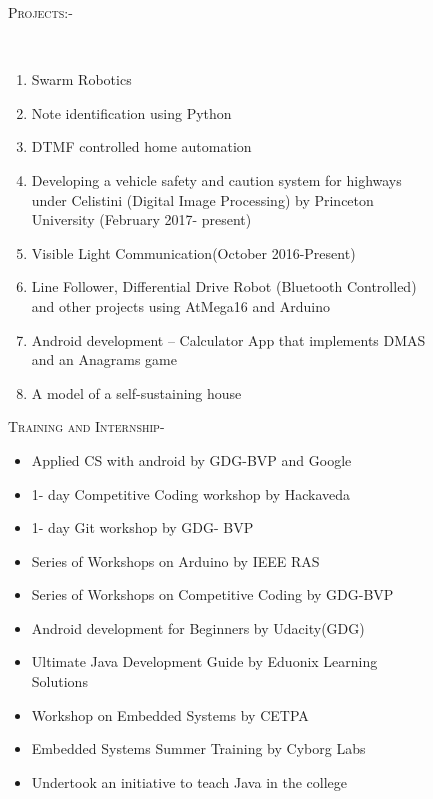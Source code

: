 \documentclass[11pt]{article}
\begin{document}
\begin{figure}[ht]
\begin{minipage}[b]{0.45\linewidth}
\flushleft
\noindent\colorbox{WeakOrange}
{\parbox{\dimexpr\textwidth-2\fboxsep\relax}{\textsc{Projects:-}}}\\
\begin{small}
\begin{enumerate}
\item  	Swarm Robotics
\item  Note identification using Python
\item  DTMF controlled home automation
\item  Developing a vehicle safety and caution system for highways under Celistini (Digital Image Processing) by Princeton University (February 2017- present)
\item 	Visible Light Communication(October 2016-Present)
\item 	Line Follower, Differential Drive Robot (Bluetooth Controlled) and other projects using AtMega16 and Arduino
\item  Android development – Calculator App that implements DMAS and an Anagrams game
\item  A model of a self-sustaining house
\end{enumerate}
\end{small}
\end{minipage}
\hspace{0.5cm}
\begin{minipage}[b]{0.45\linewidth}
\noindent\colorbox{WeakOrange}
{\parbox{\dimexpr\textwidth-2\fboxsep\relax}{\textsc{Training and Internship-}}}
\begin{small}
\begin{itemize}
\item  	Applied CS with android by GDG-BVP and Google
\item 	1- day Competitive Coding workshop by Hackaveda
\item 	1- day Git workshop by GDG- BVP
\item 	Series of Workshops on Arduino by IEEE RAS
\item	Series of Workshops on Competitive Coding by GDG-BVP
\item 	Android development for Beginners by Udacity(GDG)
\item 	 Ultimate Java Development Guide by Eduonix Learning Solutions
\item 	Workshop  on Embedded Systems by CETPA
\item 	Embedded Systems Summer Training by Cyborg Labs
\item Undertook an initiative to teach Java in the college
\end{itemize}
\end{small}
\flushleft


\end{minipage}
\end{figure}
\end{document}
